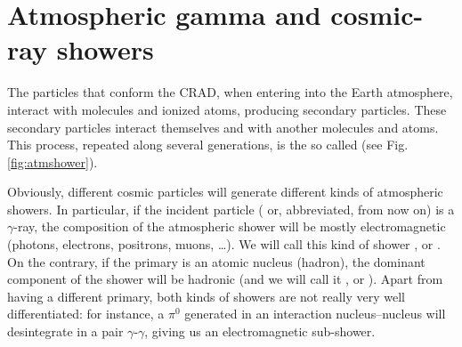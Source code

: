 

\chapter{Atmospheric gamma and cosmic-ray showers}
\label{chapter:atmshowers}

The particles that conform the CRAD, when entering into the Earth
atmosphere, interact with molecules and ionized atoms, producing
secondary particles. These secondary particles interact themselves and
with another molecules and atoms. This process, repeated along several
generations, is the so called \emph{} (see Fig.
\ref{fig:atmshower}).

Obviously, different cosmic particles will generate different kinds of
atmospheric showers. In particular, if the incident particle
(\emph{} or, abbreviated,
\emph{} from now on) is a
$\gamma$-ray, the composition of the atmospheric shower will be mostly
electromagnetic (photons, electrons, positrons, muons, \ldots). We
will call this kind of shower \emph{}, or \emph{}. On the contrary, if the primary
is an atomic nucleus (hadron), the dominant component of the shower
will be hadronic (and we will call it \emph{}, or \emph{}). Apart from having a different
primary, both kinds of showers are not really very well
differentiated: for instance, a $\pi^{0}$ generated in an interaction
nucleus--nucleus will desintegrate in a pair $\gamma$-$\gamma$, giving
us an electromagnetic sub-shower.

\atmshowerfig    %

\processesfig  %

